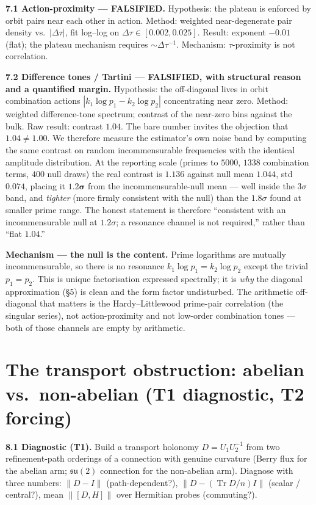 \documentclass[11pt]{article}
\newcommand{\Tr}{\operatorname{Tr}}
\begin{document}
\textbf{7.1 Action-proximity --- FALSIFIED.} Hypothesis: the plateau is enforced by orbit pairs near each other in action. Method: weighted near-degenerate pair density vs.\ $|\Delta\tau|$, fit log--log on $\Delta\tau\in[0.002,0.025]$. Result: exponent $\mathbf{-0.01}$ (flat); the plateau mechanism requires $\sim\Delta\tau^{-1}$. Mechanism: $\tau$-proximity is not correlation.

\textbf{7.2 Difference tones / Tartini --- FALSIFIED, with structural reason and a quantified margin.} Hypothesis: the off-diagonal lives in orbit combination actions $|k_1\log p_1-k_2\log p_2|$ concentrating near zero. Method: weighted difference-tone spectrum; contrast of the near-zero bins against the bulk. Raw result: contrast $\mathbf{1.04}$. The bare number invites the objection that $1.04\neq1.00$. We therefore measure the estimator's own noise band by computing the same contrast on random incommensurable frequencies with the identical amplitude distribution. At the reporting scale (primes to $5000$, $1338$ combination terms, $400$ null draws) the real contrast is $\mathbf{1.136}$ against null mean $1.044$, std $0.074$, placing it $\mathbf{1.2\sigma}$ from the incommensurable-null mean --- well inside the $3\sigma$ band, and \emph{tighter} (more firmly consistent with the null) than the $1.8\sigma$ found at smaller prime range. The honest statement is therefore ``consistent with an incommensurable null at $1.2\sigma$; a resonance channel is not required,'' rather than ``flat $1.04$.''

\textbf{Mechanism --- the null is the content.} Prime logarithms are mutually incommensurable, so there is no resonance $k_1\log p_1=k_2\log p_2$ except the trivial $p_1=p_2$. This is unique factorisation expressed spectrally; it is \emph{why} the diagonal approximation (\S5) is clean and the form factor undisturbed. The arithmetic off-diagonal that matters is the Hardy--Littlewood prime-pair correlation (the singular series), not action-proximity and not low-order combination tones --- both of those channels are empty by arithmetic.

\section{The transport obstruction: abelian vs.\ non-abelian (T1 diagnostic, T2 forcing)}

\textbf{8.1 Diagnostic (T1).} Build a transport holonomy $D=U_1U_2^{-1}$ from two refinement-path orderings of a connection with genuine curvature (Berry flux for the abelian arm; $\mathfrak{su}(2)$ connection for the non-abelian arm). Diagnose with three numbers: $\|D-I\|$ (path-dependent?), $\|D-(\Tr D/n)I\|$ (scalar / central?), mean $\|[D,H]\|$ over Hermitian probes (commuting?).
\end{document}
